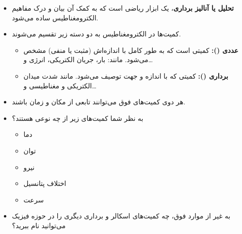 \ELhold


\begin{ELunit}


\end{ELunit}

\ELhold


\begin{ELunit}

\begin{itemize}
\tightlist
\item
  \textbf{تحلیل یا آنالیز برداری}، یک ابزار ریاضی است که به کمک آن بیان و درک مفاهیم الکترومغناطیس ساده می‌شود.
\item
  کمیت‌ها در الکترومغناطیس به دو دسته زیر تقسیم می‌شوند.

  \begin{itemize}
  \tightlist
  \item
    \textbf{عددی ():} کمیتی است که به طور کامل با اندازه‌اش (مثبت یا منفی) مشخص می‌شود. مانند: بار، جریان الکتریکی، انرژی و\ldots{}
  \item
    \textbf{برداری ():} کمیتی که با اندازه و جهت توصیف می‌شود. مانند شدت میدان الکتریکی و مغناطیسی و\ldots{}
  \end{itemize}
\item
  هر دوی کمیت‌های فوق می‌توانند تابعی از مکان و زمان باشند.
\end{itemize}

\end{ELunit}


\begin{ELexample}{}

\begin{itemize}
\tightlist
\item
  به نظر شما کمیت‌های زیر از چه نوعی هستند؟

  \begin{itemize}
  \tightlist
  \item
    دما
  \item
    توان
  \item
    نیرو
  \item
    اختلاف پتانسیل
  \item
    سرعت
  \end{itemize}
\item
  به غیر از موارد فوق، چه کمیت‌های اسکالر و برداری دیگری را در حوزه فیزیک می‌توانید نام ببرید؟
\end{itemize}

\end{ELexample}

